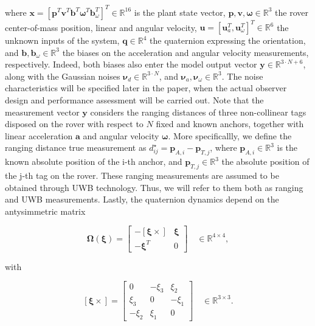 \medskip
where $\bm{x} = [\bm{p}^T \bm{v}^T \bm{b}^T \bm{\omega}^T \bm{b}_{\omega}^T]^T \in \mathbb{R}^{16}$ is the plant state vector, $\bm{p},\bm{v},\bm{\omega} \in \mathbb{R}^3$ the rover center-of-mass position, linear and angular velocity, $\bm{u} = [\bm{u}_a^T,\bm{u}_{\omega}^T]^T \in \mathbb{R}^6$ the unknown inputs of the system, $\bm{q}\in\mathbb{R}^4$ the quaternion expressing the orientation, and $\bm{b},\bm{b}_{\omega}\in\mathbb{R}^3$ the biases on the acceleration and angular velocity measurements, respectively. Indeed, both biases also enter the model output vector $\bm{y}\in\mathbb{R}^{3\cdot N + 6}$, along with the Gaussian noises $\bm{\nu}_d\in\mathbb{R}^{3\cdot N}$, and $\bm{\nu}_a,\bm{\nu}_{\omega}\in\mathbb{R}^3$. The noise characteristics will be specified later in the paper, when the actual observer design and performance assessment will be carried out. Note that the measurement vector $\bm{y}$ considers the ranging distances of three non-collinear tags disposed on the rover with respect to $N$ fixed and known anchors, together with linear acceleration $\bm{a}$ and angular velocity $\bm{\omega}$. More specificallly, we define the ranging distance true measurement as $d_{ij}^{\star} = \bm{p}_{A,i} - \bm{p}_{T,j}$, where $\bm{p}_{A,i}\in\mathbb{R}^3$ is the known absolute position of the i-th anchor, and $\bm{p}_{T,j}\in\mathbb{R}^3$ the absolute position of the j-th tag on the rover. These ranging measurements are assumed to be obtained through UWB technology. Thus, we will refer to them both as ranging and UWB measurements. Lastly, the quaternion dynamics \cite{Challa} depend on the antysimmetric matrix

\begin{equation}
	\label{prostat:eqn:OmegaMat}
	\bm{\Omega}(\bm{\xi}) =
	\begin{bmatrix}
		-[\bm{\xi}\times] & \bm{\xi} \\
		-\bm{\xi}^T       & 0
	\end{bmatrix} \quad \in \mathbb{R}^{4\times 4},
\end{equation}

\medskip
with

\begin{equation}
	\label{probstat:eqn:omegaCross}
	[\bm{\xi}\times] =
	\begin{bmatrix}
		0      & -\xi_3 & \xi_2  \\
		\xi_3  & 0      & -\xi_1 \\
		-\xi_2 & \xi_1  & 0
	\end{bmatrix} \quad \in \mathbb{R}^{3\times 3}.
\end{equation}

